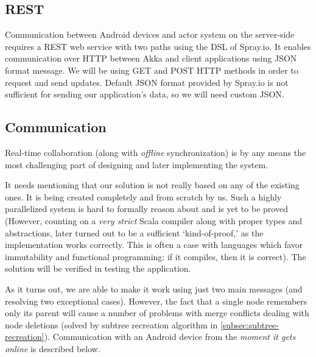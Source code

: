 %
%
%
%
%
\subsection{REST}
\label{subsec:restful}
 Communication between Android devices and actor system on the server-side requires a REST web service with two paths using the DSL of Spray.io. It enables communication over HTTP between Akka and client applications using JSON format message. We will be using GET and POST HTTP methods in order to request and send updates. Default JSON format provided by Spray.io is not sufficient for sending our application's data, so we will need custom JSON.  
 

\subsection{Communication}
\label{subsec:android-akka-comm}

Real-time collaboration (along with \emph{offline} synchronization) is by any means the most challenging part of designing and later implementing the system.

It needs mentioning that our solution is not really based on any of the existing ones. It is being created completely and from scratch by us. Such a highly parallelized system is hard to formally reason about and is yet to be proved (However, counting on a \emph{very strict} Scala compiler along with proper types and abstractions, later turned out to be a sufficient `kind-of-proof,' as the implementation works correctly. This is often a case with languages which favor immutability and functional programming: if it compiles, then it is correct). The solution will be verified in testing the application. 

As it turns out, we are able to make it work using just two main messages (and resolving two exceptional cases). However, the fact that a single node remembers only its parent will cause a number of problems with merge conflicts dealing with node deletions (solved by subtree recreation algorithm in \cref{subsec:subtree-recreation}). Communication with an Android device from the \emph{moment it gets online} is described below.

